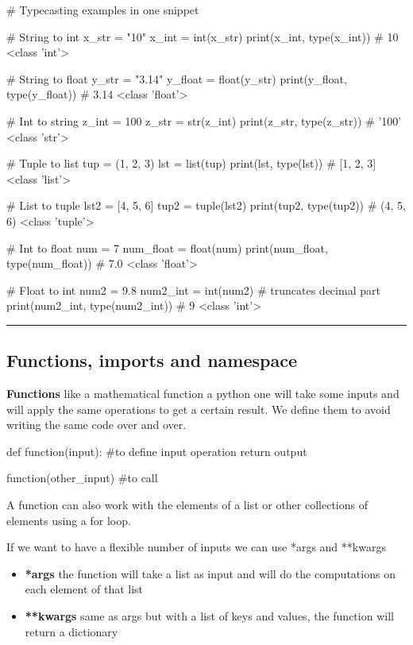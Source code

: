 \begin{pythoncode}
    # Typecasting examples in one snippet

# String to int
x_str = "10"
x_int = int(x_str)
print(x_int, type(x_int))  # 10 <class 'int'>

# String to float
y_str = "3.14"
y_float = float(y_str)
print(y_float, type(y_float))  # 3.14 <class 'float'>

# Int to string
z_int = 100
z_str = str(z_int)
print(z_str, type(z_str))  # '100' <class 'str'>

# Tuple to list
tup = (1, 2, 3)
lst = list(tup)
print(lst, type(lst))  # [1, 2, 3] <class 'list'>

# List to tuple
lst2 = [4, 5, 6]
tup2 = tuple(lst2)
print(tup2, type(tup2))  # (4, 5, 6) <class 'tuple'>

# Int to float
num = 7
num_float = float(num)
print(num_float, type(num_float))  # 7.0 <class 'float'>

# Float to int
num2 = 9.8
num2_int = int(num2)  # truncates decimal part
print(num2_int, type(num2_int))  # 9 <class 'int'>

\end{pythoncode}

\hrule

\subsection{Functions, imports and namespace}

\textbf{Functions} \ra like a mathematical function a python one will take some inputs and will apply the same operations to get a certain result. We define them to avoid writing the same code over and over.

\begin{pythoncode}
    def function(input): #to define
        input operation
        return output

    function(other_input) #to call
\end{pythoncode}

\vspace{10pt}

A function can also work with the elements of a list or other collections of elements using a for loop.

\vspace{10pt}

If we want to have a flexible number of inputs we can use *args and **kwargs

\begin{itemize}
    \item \textbf{*args} \ra the function will take a list as input and will do the computations on each element of that list
    \item \textbf{**kwargs} \ra same as args but with a list of keys and values, the function will return a dictionary
\end{itemize}

